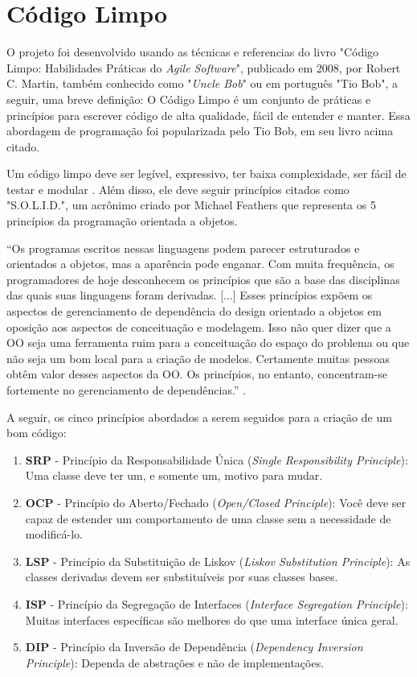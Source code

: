 \section{Código Limpo}\label{sec:codigo_limpo}
O projeto foi desenvolvido usando as técnicas e referencias do livro "Código Limpo: Habilidades Práticas do \textit{Agile Software}", publicado em 2008, por Robert C. Martin, também conhecido como "\textit{Uncle Bob}" ou em português "Tio Bob", a seguir, uma breve definição: O Código Limpo é um conjunto de práticas e princípios para escrever código de alta qualidade, fácil de entender e manter. Essa abordagem de programação foi popularizada pelo Tio Bob, em seu livro acima citado.

Um código limpo deve ser legível, expressivo, ter baixa complexidade, ser fácil de testar e modular \cite{martin2008codigolimpo}. Além disso, ele deve seguir princípios citados como "S.O.L.I.D.", um acrônimo criado por Michael Feathers que representa os 5 princípios da programação orientada a objetos.

“Os programas escritos nessas linguagens podem parecer estruturados e orientados a objetos, mas a aparência pode enganar. Com muita frequência, os programadores de hoje desconhecem os princípios que são a base das disciplinas das quais suas linguagens foram derivadas. [...] Esses princípios expõem os aspectos de gerenciamento de dependência do design orientado a objetos em oposição aos aspectos de conceituação e modelagem. Isso não quer dizer que a OO seja uma ferramenta ruim para a conceituação do espaço do problema ou que não seja um bom local para a criação de modelos. Certamente muitas pessoas obtêm valor desses aspectos da OO. Os princípios, no entanto, concentram-se fortemente no gerenciamento de dependências.” \cite{martin2005principles}.

A seguir, os cinco princípios abordados a serem seguidos para a criação de um bom código:
\begin{enumerate}
    \item \textbf{SRP} - Princípio da Responsabilidade Única (\textit{Single Responsibility Principle}): Uma classe deve ter um, e somente um, motivo para mudar.
    \item \textbf{OCP} - Princípio do Aberto/Fechado (\textit{Open/Closed Principle}): Você deve ser capaz de estender um comportamento de uma classe sem a necessidade de modificá-lo.
    \item \textbf{LSP} - Princípio da Substituição de Liskov (\textit{Liskov Substitution Principle}): As classes derivadas devem ser substituíveis por suas classes bases.
    \item \textbf{ISP} - Princípio da Segregação de Interfaces (\textit{Interface Segregation Principle}): Muitas interfaces específicas são melhores do que uma interface única geral.
    \item \textbf{DIP} - Princípio da Inversão de Dependência (\textit{Dependency Inversion Principle}): Dependa de abstrações e não de implementações.
\end{enumerate}

